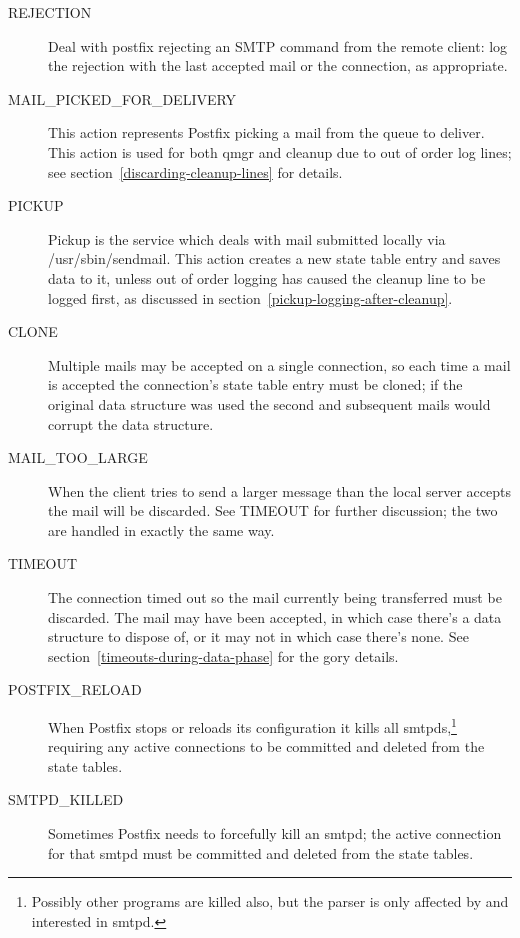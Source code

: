 \documentclass[a4paper,12pt,draft]{article}
\begin{document}
\begin{description}
    \item [REJECTION] Deal with postfix rejecting an SMTP command from the
        remote client: log the rejection with the last accepted mail or the
        connection, as appropriate.

    \item [MAIL\_PICKED\_FOR\_DELIVERY] This action represents Postfix
        picking a mail from the queue to deliver. This action is used for
        both qmgr and cleanup due to out of order log lines; see
        section~\ref{discarding-cleanup-lines} for details.

    \item [PICKUP] Pickup is the service which deals with mail submitted
        locally via /usr/sbin/sendmail. This action creates a new state
        table entry and saves data to it, unless out of order logging has
        caused the cleanup line to be logged first, as discussed in
        section~\ref{pickup-logging-after-cleanup}.

    \item [CLONE] Multiple mails may be accepted on a single connection, so
        each time a mail is accepted the connection's state table entry
        must be cloned; if the original data structure was used the second
        and subsequent mails would corrupt the data structure.

    \item [MAIL\_TOO\_LARGE] When the client tries to send a larger message
        than the local server accepts the mail will be discarded.  See
        TIMEOUT for further discussion; the two are handled in exactly the
        same way.

    \item [TIMEOUT] The connection timed out so the mail currently being
        transferred must be discarded. The mail may have been accepted, in
        which case there's a data structure to dispose of, or it may not in
        which case there's none. See
        section~\ref{timeouts-during-data-phase} for the gory details.

    \item [POSTFIX\_RELOAD] When Postfix stops or reloads its configuration
        it kills all smtpds,\footnote{Possibly other programs are killed
        also, but the parser is only affected by and interested in smtpd.}
        requiring any active connections to be committed and deleted from
        the state tables.

    \item [SMTPD\_KILLED] Sometimes Postfix needs to forcefully kill an
        smtpd; the active connection for that smtpd must be committed and
        deleted from the state tables.


\end{description}
\end{document}
